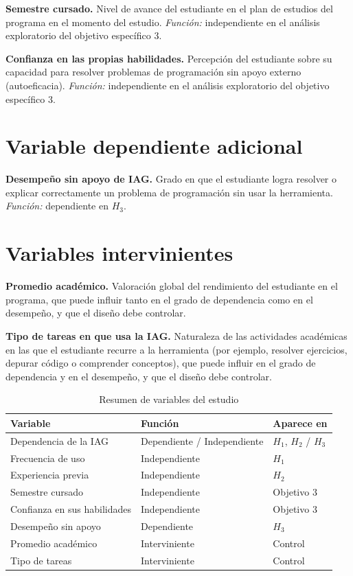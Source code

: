 \documentclass[12pt,a4paper,oneside]{report}
\begin{document}
\textbf{Semestre cursado.} Nivel de avance del estudiante en el plan de estudios del programa en el momento del estudio. \textit{Función:} independiente en el análisis exploratorio del objetivo específico 3.

\textbf{Confianza en las propias habilidades.} Percepción del estudiante sobre su capacidad para resolver problemas de programación sin apoyo externo (autoeficacia). \textit{Función:} independiente en el análisis exploratorio del objetivo específico 3.

\section{Variable dependiente adicional}

\textbf{Desempeño sin apoyo de IAG.} Grado en que el estudiante logra resolver o explicar correctamente un problema de programación sin usar la herramienta. \textit{Función:} dependiente en $H_3$.

\section{Variables intervinientes}

\textbf{Promedio académico.} Valoración global del rendimiento del estudiante en el programa, que puede influir tanto en el grado de dependencia como en el desempeño, y que el diseño debe controlar.

\textbf{Tipo de tareas en que usa la IAG.} Naturaleza de las actividades académicas en las que el estudiante recurre a la herramienta (por ejemplo, resolver ejercicios, depurar código o comprender conceptos), que puede influir en el grado de dependencia y en el desempeño, y que el diseño debe controlar.

\begin{table}[htbp]
  \centering
  \caption{Resumen de variables del estudio}
  \label{tab:variables}
  \begin{tabular}{@{}p{6cm}p{4.5cm}p{3cm}@{}}
    \toprule
    \textbf{Variable} & \textbf{Función} & \textbf{Aparece en} \\
    \midrule
    Dependencia de la IAG & Dependiente / Independiente & $H_1$, $H_2$ / $H_3$ \\
    Frecuencia de uso & Independiente & $H_1$ \\
    Experiencia previa & Independiente & $H_2$ \\
    Semestre cursado & Independiente & Objetivo 3 \\
    Confianza en sus habilidades & Independiente & Objetivo 3 \\
    Desempeño sin apoyo & Dependiente & $H_3$ \\
    Promedio académico & Interviniente & Control \\
    Tipo de tareas & Interviniente & Control \\
    \bottomrule
  \end{tabular}
\end{table}
\end{document}
